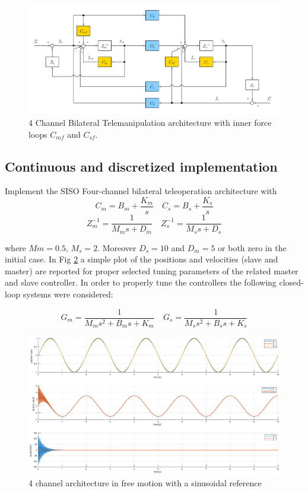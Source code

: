 \documentclass[a4paper,12pt]{article}
\begin{document}
\begin{figure}[H]
    \begin{center}
        \hspace*{-2cm}
        \includegraphics[scale=0.3]{images/four_channel.png}
    \end{center}
    \caption{4 Channel Bilateral Telemanipulation architecture with inner force loops $C_{mf}$ and $C_{sf}$.}
    \label{fig:four_channel}
\end{figure}

\subsection{Continuous and discretized implementation}
Implement the SISO Four-channel bilateral teleoperation architecture with
\[
    C_m = B_m + \frac{K_m}{s} \quad
    C_s = B_s + \frac{K_s}{s}
\]
\[
    Z_m^{-1} = \frac{1}{M_ms + D_m} \quad
    Z_s^{-1} = \frac{1}{M_ss + D_s}
\]

\bigskip
\noindent where $Mm = 0.5$, $M_s = 2$. Moreover $D_s = 10$ and $D_m = 5$ or both zero in the initial case. In Fig \ref{fig:four_free} a simple plot of the positions and velocities (slave and master) are reported for proper selected tuning parameters of the related master and slave controller. In order to properly tune the controllers the following closed-loop systems were considered:

\[
G_m = \frac{1}{M_ms^2+B_ms+K_m} \quad
G_s = \frac{1}{M_ss^2+B_ss+K_s}
\]

\begin{figure}[H]
    \begin{center}
        \hspace*{-4.4cm}
        \includegraphics[scale=0.5]{images/four_free_motion.eps}
    \end{center}
    \caption{4 channel architecture in free motion with a sinusoidal reference}
    \label{fig:four_free}
\end{figure}
\end{document}
